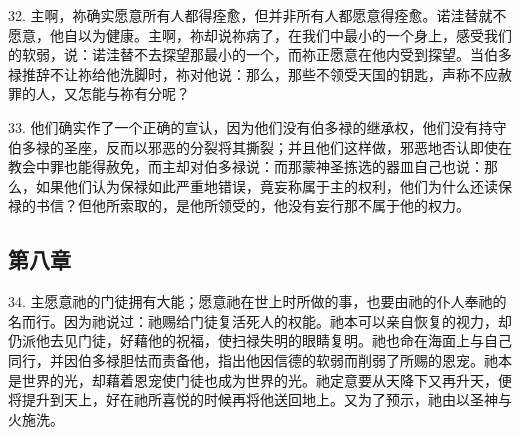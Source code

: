 32. 主啊，祢确实愿意所有人都得痊愈，但并非所有人都愿意得痊愈。诺洼替就不愿意，他自以为健康。主啊，祢却说祢病了，在我们中最小的一个身上，感受我们的软弱，说：诺洼替不去探望那最小的一个，而祢正愿意在他内受到探望。当伯多禄推辞不让祢给他洗脚时，祢对他说：那么，那些不领受天国的钥匙，声称不应赦罪的人，又怎能与祢有分呢？\par

33. 他们确实作了一个正确的宣认，因为他们没有伯多禄的继承权，他们没有持守伯多禄的圣座，反而以邪恶的分裂将其撕裂；并且他们这样做，邪恶地否认即使在教会中罪也能得赦免，而主却对伯多禄说：而那蒙神圣拣选的器皿自己也说：那么，如果他们认为保禄如此严重地错误，竟妄称属于主的权利，他们为什么还读保禄的书信？但他所索取的，是他所领受的，他没有妄行那不属于他的权力。\par


\subsection{第八章}

\par

34. 主愿意祂的门徒拥有大能；愿意祂在世上时所做的事，也要由祂的仆人奉祂的名而行。因为祂说过：祂赐给门徒复活死人的权能。祂本可以亲自恢复的视力，却仍派他去见门徒，好藉他的祝福，使扫禄失明的眼睛复明。祂也命在海面上与自己同行，并因伯多禄胆怯而责备他，指出他因信德的软弱而削弱了所赐的恩宠。祂本是世界的光，却藉着恩宠使门徒也成为世界的光。祂定意要从天降下又再升天，便将提升到天上，好在祂所喜悦的时候再将他送回地上。又为了预示，祂由以圣神与火施洗。\par

